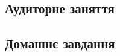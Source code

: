 \subsection{Аудиторне заняття}

\begin{problem}

\end{problem}

\begin{problem}

\end{problem}

\begin{problem}

\end{problem}

\begin{problem}

\end{problem}

\begin{problem}

\end{problem}

\begin{problem}

\end{problem}

\subsection{Домашнє завдання}

\begin{problem}

\end{problem}

\begin{problem}

\end{problem}

\begin{problem}

\end{problem}

\begin{problem}

\end{problem}

\begin{problem}

\end{problem}

\begin{problem}

\end{problem}